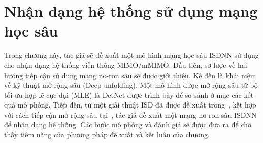 \clearpage
{}

\setcounter{chapter}{2}
\chapter[NHẬN DẠNG HỆ THỐNG SỬ DỤNG MẠNG HỌC SÂU]{Nhận dạng hệ thống sử dụng mạng học sâu}
\label{sec:ML}

Trong chương này, tác giả sẽ đề xuất một mô hình mạng học sâu ISDNN sử dụng cho nhận dạng hệ thống viễn thông MIMO/mMIMO. Đầu tiên, sơ lược về hai hướng tiếp cận sử dụng mạng nơ-ron sâu sẽ được giới thiệu. Kế đến là khái niệm về kỹ thuật mở rộng sâu (Deep unfolding). Một mô hình được mở rộng sâu từ bộ tối ưu hợp lẽ cực đại (MLE) là DetNet được trình bày để so sánh ở mục các kết quả mô phỏng. Tiếp đến, từ một giải thuật ISD đã được đề xuất trong~\cite{Mandloi2017}, kết hợp với cách tiếp cận mở rộng sâu tại~\cite{Liao2020}, tác giả đề xuất một mạng nơ-ron sâu ISDNN để nhận dạng hệ thống. Các bước mô phỏng và đánh giá sẽ được đưa ra để cho thấy tiềm năng của phương pháp đề xuất và kết luận của chương. 

